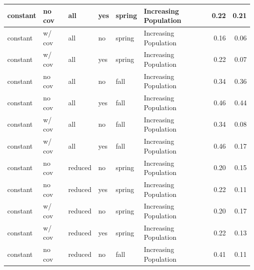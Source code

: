 \documentclass[
  12pt,
]{article}
\begin{document}
\begin{table}
\begin{tabular}{l|l|l|l|l|l|r|r}
\hline
\hspace{1em}\hspace{1em}constant & no cov & all & yes & spring & Increasing Population & 0.22 & 0.21\\
\hline
\hspace{1em}\hspace{1em}constant & w/ cov & all & no & spring & Increasing Population & 0.16 & 0.06\\
\hline
\hspace{1em}\hspace{1em}constant & w/ cov & all & yes & spring & Increasing Population & 0.22 & 0.07\\
\hline
\hspace{1em}\hspace{1em}constant & no cov & all & no & fall & Increasing Population & 0.34 & 0.36\\
\hline
\hspace{1em}\hspace{1em}constant & no cov & all & yes & fall & Increasing Population & 0.46 & 0.44\\
\hline
\hspace{1em}\hspace{1em}constant & w/ cov & all & no & fall & Increasing Population & 0.34 & 0.08\\
\hline
\hspace{1em}\hspace{1em}constant & w/ cov & all & yes & fall & Increasing Population & 0.46 & 0.17\\
\hline
\hspace{1em}\hspace{1em}constant & no cov & reduced & no & spring & Increasing Population & 0.20 & 0.15\\
\hline
\hspace{1em}\hspace{1em}constant & no cov & reduced & yes & spring & Increasing Population & 0.22 & 0.11\\
\hline
\hspace{1em}\hspace{1em}constant & w/ cov & reduced & no & spring & Increasing Population & 0.20 & 0.17\\
\hline
\hspace{1em}\hspace{1em}constant & w/ cov & reduced & yes & spring & Increasing Population & 0.22 & 0.13\\
\hline
\hspace{1em}\hspace{1em}constant & no cov & reduced & no & fall & Increasing Population & 0.41 & 0.11\\

\end{tabular}
\end{table}
\end{document}
